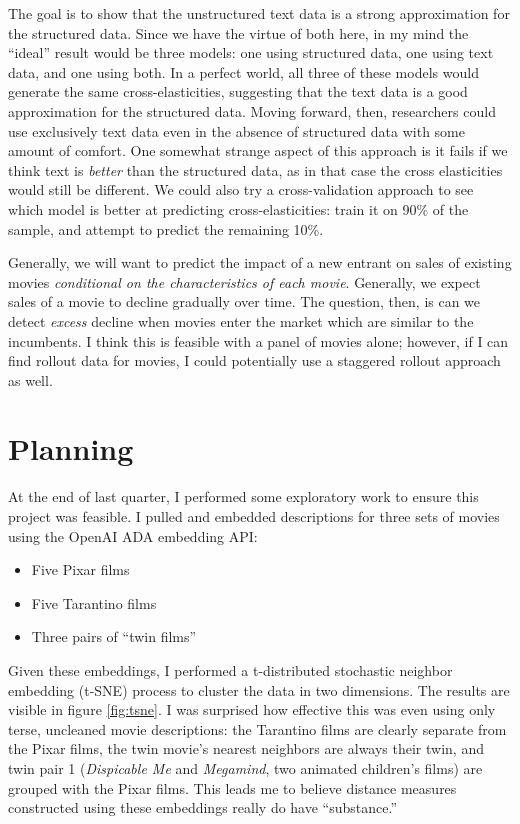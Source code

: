 \documentclass{article}
\begin{document}
The goal is to show that the unstructured text data is a strong approximation for the structured data. Since we have the virtue of both here, in my mind the ``ideal'' result would be three models: one using structured data, one using text data, and one using both. In a perfect world, all three of these models would generate the same cross-elasticities, suggesting that the text data is a good approximation for the structured data. Moving forward, then, researchers could use exclusively text data even in the absence of structured data with some amount of comfort. One somewhat strange aspect of this approach is it fails if we think text is \emph{better} than the structured data, as in that case the cross elasticities would still be different. We could also try a cross-validation approach to see which model is better at predicting cross-elasticities: train it on 90\% of the sample, and attempt to predict the remaining 10\%. 

Generally, we will want to predict the impact of a new entrant on sales of existing movies \emph{conditional on the characteristics of each movie}. Generally, we expect sales of a movie to decline gradually over time. The question, then, is can we detect \emph{excess} decline when movies enter the market which are similar to the incumbents. I think this is feasible with a panel of movies alone; however, if I can find rollout data for movies, I could potentially use a staggered rollout approach as well. 

\section{Planning}

At the end of last quarter, I performed some exploratory work to ensure this project was feasible. I pulled and embedded descriptions for three sets of movies using the OpenAI ADA embedding API:
\begin{itemize}
    \item Five Pixar films
    \item Five Tarantino films
    \item Three pairs of ``twin films''
\end{itemize}

Given these embeddings, I performed a t-distributed stochastic neighbor embedding (t-SNE) process to cluster the data in two dimensions. The results are visible in figure \ref{fig:tsne}. I was surprised how effective this was even using only terse, uncleaned movie descriptions: the Tarantino films are clearly separate from the Pixar films, the twin movie's nearest neighbors are always their twin, and twin pair 1 (\emph{Dispicable Me} and \emph{Megamind}, two animated children's films) are grouped with the Pixar films. This leads me to believe distance measures constructed using these embeddings really do have ``substance.''
\end{document}
